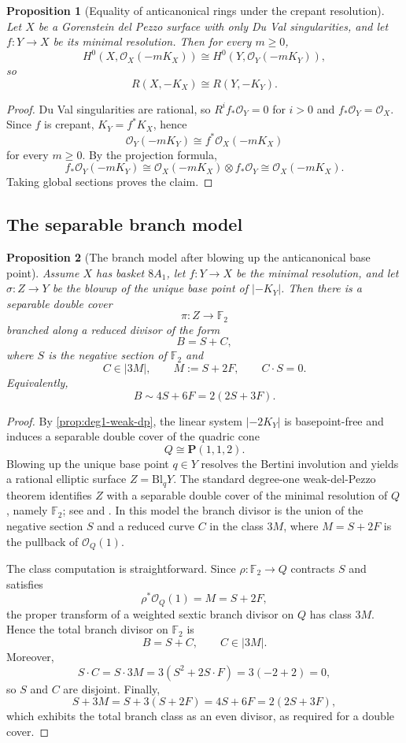 \documentclass[11pt]{article}
\newtheorem{proposition}[proposition]{Proposition}
\theoremstyle{definition}
\newcommand{\Bl}{\mathrm{Bl}}
\begin{document}
\begin{proposition}[Equality of anticanonical rings under the crepant resolution]\label{prop:ring-equality}
Let $X$ be a Gorenstein del Pezzo surface with only Du Val singularities, and let $f\colon Y\to X$ be its minimal resolution. Then for every $m\ge 0$,
\[
H^0(X,\mathcal O_X(-mK_X))\cong H^0(Y,\mathcal O_Y(-mK_Y)),
\]
so
\[
R(X,-K_X)\cong R(Y,-K_Y).
\]
\end{proposition}

\begin{proof}
Du Val singularities are rational, so $R^if_*\mathcal O_Y=0$ for $i>0$ and $f_*\mathcal O_Y=\mathcal O_X$. Since $f$ is crepant, $K_Y=f^*K_X$, hence
\[
\mathcal O_Y(-mK_Y)\cong f^*\mathcal O_X(-mK_X)
\]
for every $m\ge 0$. By the projection formula,
\[
f_*\mathcal O_Y(-mK_Y)\cong \mathcal O_X(-mK_X)\otimes f_*\mathcal O_Y\cong \mathcal O_X(-mK_X).
\]
Taking global sections proves the claim.
\end{proof}

\subsection{The separable branch model}

\begin{proposition}[The branch model after blowing up the anticanonical base point]\label{prop:branch-model}
Assume $X$ has basket $8A_1$, let $f\colon Y\to X$ be the minimal resolution, and let $\sigma\colon Z\to Y$ be the blowup of the unique base point of $|-K_Y|$. Then there is a separable double cover
\[
\pi\colon Z\to \mathbb F_2
\]
branched along a reduced divisor of the form
\[
B=S+C,
\]
where $S$ is the negative section of $\mathbb F_2$ and
\[
C\in |3M|,\qquad M:=S+2F,
\qquad C\cdot S=0.
\]
Equivalently,
\[
B\sim 4S+6F=2(2S+3F).
\]
\end{proposition}

\begin{proof}
By \cref{prop:deg1-weak-dp}, the linear system $|-2K_Y|$ is basepoint-free and induces a separable double cover of the quadric cone
\[
Q\cong \mathbf P(1,1,2).
\]
Blowing up the unique base point $q\in Y$ resolves the Bertini involution and yields a rational elliptic surface $Z=\Bl_qY$. The standard degree-one weak-del-Pezzo theorem identifies $Z$ with a separable double cover of the minimal resolution of $Q$, namely $\mathbb F_2$; see \cite[Prop.~2.2 and Rem.~2.3]{AscherBejleri21} and \cite{HW81}. In this model the branch divisor is the union of the negative section $S$ and a reduced curve $C$ in the class $3M$, where $M=S+2F$ is the pullback of $\mathcal O_Q(1)$.

The class computation is straightforward. Since $\rho\colon \mathbb F_2\to Q$ contracts $S$ and satisfies
\[
\rho^*\mathcal O_Q(1)=M=S+2F,
\]
the proper transform of a weighted sextic branch divisor on $Q$ has class $3M$. Hence the total branch divisor on $\mathbb F_2$ is
\[
B=S+C,\qquad C\in |3M|.
\]
Moreover,
\[
S\cdot C = S\cdot 3M = 3(S^2+2S\cdot F)=3(-2+2)=0,
\]
so $S$ and $C$ are disjoint. Finally,
\[
S+3M = S+3(S+2F)=4S+6F=2(2S+3F),
\]
which exhibits the total branch class as an even divisor, as required for a double cover.
\end{proof}
\end{document}
